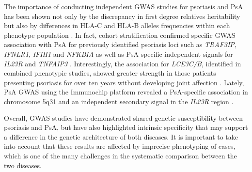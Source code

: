 The importance of conducting independent GWAS studies for psoriasis and PsA has been shown not only by the discrepancy in first degree relatives heritability but also by differences in HLA-C and HLA-B alleles frequencies within each phenotype population \parencite{Winchester2012, Okada2014}. In fact, cohort stratification confirmed specific GWAS association with PsA for previously identified psoriasis loci such as \textit{TRAF3IP}, \textit{IFNLR1}, \textit{IFIH1} and \textit{NFKBIA} as well as PsA-specific independent signals for \textit{IL23R} and \textit{TNFAIP3} \parencite{Ellinghaus2010, Stuart2015}.  Interestingly, the association for \textit{LCE3C/B}, identified in combined phenotypic studies, showed greater strength in those patients presenting psoriasis for over ten years without developing joint affection \parencite{Stuart2015}. Lately, PsA GWAS using the Immunochip platform revealed a PsA-specific association in chromosome 5q31 and an independent secondary signal in the \textit{IL23R} region \parencite{Bowes2015}. 

Overall, GWAS studies have demonstrated shared genetic susceptibility between psoriasis and PsA, but have also highlighted intrinsic specificity that may support a difference in the genetic architecture of both diseases. It is important to take into account that these results are affected by imprecise phenotyping of cases, which is one of the many challenges in the systematic comparison between the two diseases.


